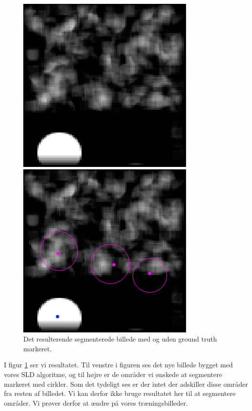 \begin{figure}[H]
	\begin{minipage}[b]{0.5\linewidth}
		\centering
		\includegraphics[scale=0.54]{files/postmethod/img/sld_res2.png}
	\end{minipage}
	\hspace{0.8cm}
	\begin{minipage}[b]{0.5\linewidth}
		\centering
		\includegraphics[scale=0.54]{files/postmethod/img/sld_res22.png}
	\end{minipage}
	\caption{Det resulterende segmenterede billede med og uden ground truth markeret.\label{fig:postmethod_sld_res22}}
\end{figure}

I figur \ref{fig:postmethod_sld_res22} ser vi resultatet. Til venstre i figuren ses det nye billede bygget med vores SLD algoritme, og til højre er de områder vi ønskede at segmentere markeret med cirkler. Som det tydeligt ses er der intet der adskiller disse områder fra resten af billedet. Vi kan derfor ikke bruge resultatet her til at segmentere områder. Vi prøver derfor at ændre på vores træningsbilleder.

